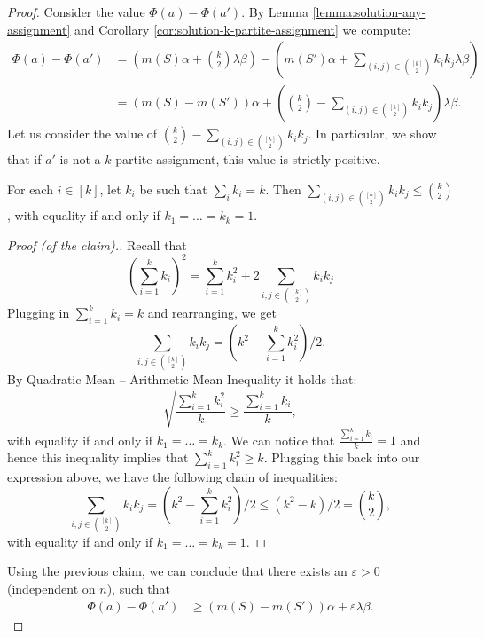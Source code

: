 \documentclass[a4paper,UKenglish,cleveref, autoref, thm-restate,numberwithinsect]{lipics-v2021}
\begin{document}
\begin{proof}
    Consider the value $\Phi(a)-\Phi(a')$. By Lemma \ref{lemma:solution-any-assignment} and Corollary \ref{cor:solution-k-partite-assignment} we compute:
    \begin{align*}
        \Phi(a)-\Phi(a') &= \left(m(S)\alpha + \binom{k}{2} \lambda \beta \right) - \left( m(S')\alpha + \sum_{(i,j)\in \binom{[k]}{2}} k_ik_j \lambda \beta \right) \\
        & = \left(m(S)-m(S')\right)\alpha + \left(\binom{k}{2}-\sum_{(i,j)\in \binom{[k]}{2}} k_ik_j\right)\lambda\beta.
    \end{align*}
    Let us consider the value of $\binom{k}{2}-\sum_{(i,j)\in \binom{[k]}{2}} k_ik_j$. In particular, we show that if $a'$ is not a $k$-partite assignment, this value is strictly positive.
    \begin{claim}
        For each $i\in [k]$, let $k_i$ be such that $\sum_i k_i = k$. Then $\sum_{(i,j)\in \binom{[k]}{2}}k_ik_j\leq \binom{k}{2}$, with equality if and only if $k_1=\dots = k_k = 1$.
    \end{claim}
    \begin{proof}[Proof (of the claim).]
        Recall that
        \[
        \left(\sum_{i=1}^kk_i\right)^2 = \sum_{i=1}^kk_i^2 + 2\sum_{i,j\in \binom{[k]}{2}}k_ik_j
        \]
        Plugging in $\sum_{i=1}^kk_i=k$ and rearranging, we get
        \[
        \sum_{i,j\in \binom{[k]}{2}}k_ik_j = \left(k^2 - \sum_{i=1}^kk_i^2\right)\Big/{2}.
        \]
        By Quadratic Mean -- Arithmetic Mean Inequality it holds that:
        \[
            \sqrt{\frac{\sum_{i=1}^k k_i^2}{k}}\geq \frac{\sum_{i=1}^kk_i}{k},
        \]
        with equality if and only if $k_1=\dots = k_k$.
        We can notice that $\frac{\sum_{i=1}^kk_i}{k} = 1$ and hence this inequality implies that $\sum_{i=1}^k k_i^2\geq k$.
        Plugging this back into our expression above, we have the following chain of inequalities:
        \[
            \sum_{i,j\in \binom{[k]}{2}}k_ik_j = \left(k^2 - \sum_{i=1}^kk_i^2\right)\Big/{2} \leq \left(k^2 - k\right)\big/{2} = \binom{k}{2},
        \]
        with equality if and only if $k_1=\dots = k_k=1$.
        \renewcommand{\qedsymbol}{$\vartriangleleft$}
    \end{proof}
    Using the previous claim, we can conclude that there exists an $\varepsilon>0$ (independent on $n$), such that
    \begin{align*}
        \Phi(a)-\Phi(a') &\ge \left(m(S)-m(S')\right)\alpha + \varepsilon\lambda\beta.
    \end{align*}

\end{proof}
\end{document}
